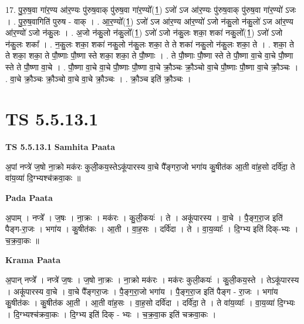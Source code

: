 \documentclass[17pt]{extarticle}
\begin{document}
17. पु॒रु॒ष॒वा गा॑र॒ण्य आ॑र॒ण्यः पु॑रुष॒वाक् पु॑रुष॒वा गा॑र॒ण्यो᳚(1॒) ऽजो॑ ऽज आ॑र॒ण्यः पु॑रुष॒वाक् पु॑रुष॒वा गा॑र॒ण्यो॑ ऽजः । . पु॒रु॒ष॒वागिति॑ पुरुष - वाक् । . आ॒र॒ण्यो᳚(1॒) ऽजो॑ ऽज आ॑र॒ण्य आ॑र॒ण्यो॑ ऽजो न॑कु॒लो न॑कु॒लो॑ ऽज आ॑र॒ण्य आ॑र॒ण्यो॑ ऽजो न॑कु॒लः । . अ॒जो न॑कु॒लो न॑कु॒लो᳚(1॒) ऽजो॑ ऽजो न॑कु॒लः शका॒ शका॑ नकु॒लो᳚(1॒) ऽजो॑ ऽजो न॑कु॒लः शका᳚ । . न॒कु॒लः शका॒ शका॑ नकु॒लो न॑कु॒लः शका॒ ते ते शका॑ नकु॒लो न॑कु॒लः शका॒ ते । . शका॒ ते ते शका॒ शका॒ ते पौ॒ष्णाः पौ॒ष्णा स्ते शका॒ शका॒ ते पौ॒ष्णाः । . ते पौ॒ष्णाः पौ॒ष्णा स्ते ते पौ॒ष्णा वा॒चे वा॒चे पौ॒ष्णा स्ते ते पौ॒ष्णा वा॒चे । . पौ॒ष्णा वा॒चे वा॒चे पौ॒ष्णाः पौ॒ष्णा वा॒चे क्रौ॒ञ्चः क्रौ॒ञ्चो वा॒चे पौ॒ष्णाः पौ॒ष्णा वा॒चे क्रौ॒ञ्चः । . वा॒चे क्रौ॒ञ्चः क्रौ॒ञ्चो वा॒चे वा॒चे क्रौ॒ञ्चः । . क्रौ॒ञ्च इति॑ क्रौ॒ञ्चः । \newline
\pagebreak
{}

\section{ TS 5.5.13.1 }

\textbf{TS 5.5.13.1 } \newline
\textbf{Samhita Paata} \newline

अ॒पां नप्त्रे॑ ज॒षो ना॒क्रो मक॑रः कुली॒कय॒स्तेऽकू॑पारस्य वा॒चे पै᳚ङ्गरा॒जो भगा॑य कु॒षीत॑क आ॒ती वा॑ह॒सो दर्वि॑दा॒ ते वा॑य॒व्या॑ दि॒ग्भ्यश्च॑क्रवा॒कः ॥ \newline

\textbf{Pada Paata} \newline

अ॒पाम् । नप्त्रे᳚ । ज॒षः । ना॒क्रः । मक॑रः । कु॒ली॒कयः॑ । ते । अकू॑पारस्य । वा॒चे । पै॒ङ्ग॒रा॒ज इति॑ पैङ्ग-रा॒जः । भगा॑य । कु॒षीत॑कः । आ॒ती । वा॒ह॒सः । दर्वि॑दा । ते । वा॒य॒व्याः᳚ । दि॒ग्भ्य इति॑ दिक्-भ्यः । च॒क्र॒वा॒कः ॥  \newline


\textbf{Krama Paata} \newline

अ॒पान् नप्त्रे᳚ । नप्त्रे॑ ज॒षः । ज॒षो ना॒क्रः । ना॒क्रो मक॑रः । मक॑रः कुली॒कयः॑ । कु॒ली॒कय॒स्ते । तेऽकू॑पारस्य । अकू॑पारस्य वा॒चे । वा॒चे पै᳚ङ्गरा॒जः । पै॒ङ्ग॒रा॒जो भगा॑य । पै॒ङ्ग॒रा॒ज इति॑ पैङ्ग - रा॒जः । भगा॑य कु॒षीत॑कः । कु॒षीत॑क आ॒ती । आ॒ती वा॑ह॒सः । वा॒ह॒सो दर्वि॑दा । दर्वि॑दा॒ ते । ते वा॑य॒व्याः᳚ । वा॒य॒व्या॑ दि॒ग्भ्यः । दि॒ग्भ्यश्च॑क्रवा॒कः । दि॒ग्भ्य इति॑ दिक् - भ्यः । च॒क्र॒वा॒क इति॑ चक्रवा॒कः । \newline
\end{document}
